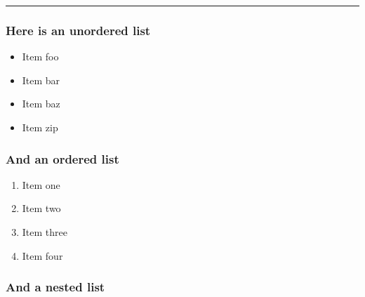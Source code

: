 \documentclass[
  12pt,
]{article}
\providecommand{\tightlist}{%
  \setlength{\itemsep}{0pt}\setlength{\parskip}{0pt}}
\begin{document}
\begin{center}\rule{0.5\linewidth}{0.5pt}\end{center}

\hypertarget{here-is-an-unordered-list}{%
\subsubsection{Here is an unordered
list}\label{here-is-an-unordered-list}}

\begin{itemize}
\tightlist
\item
  Item foo
\item
  Item bar
\item
  Item baz
\item
  Item zip
\end{itemize}

\hypertarget{and-an-ordered-list}{%
\subsubsection{And an ordered list}\label{and-an-ordered-list}}

\begin{enumerate}
\def\labelenumi{\arabic{enumi}.}
\tightlist
\item
  Item one
\item
  Item two
\item
  Item three
\item
  Item four
\end{enumerate}

\hypertarget{and-a-nested-list}{%
\subsubsection{And a nested list}\label{and-a-nested-list}}
\end{document}
